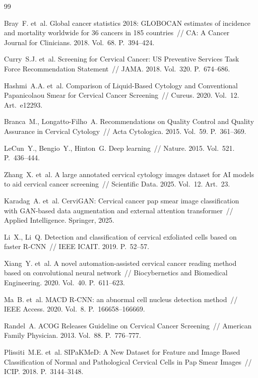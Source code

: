 \documentclass[14pt,a4paper]{extreport}
\begin{document}
\renewcommand{\bibname}{Список литературы}
\begin{thebibliography}{99}

Bray~F. et~al. Global cancer statistics 2018: GLOBOCAN estimates of
incidence and mortality worldwide for 36 cancers in 185 countries~//
CA: A Cancer Journal for Clinicians. 2018. Vol.~68. P.~394--424.

Curry~S.J. et~al. Screening for Cervical Cancer: US Preventive Services
Task Force Recommendation Statement~// JAMA. 2018. Vol.~320. P.~674--686.

Hashmi~A.A. et~al. Comparison of Liquid-Based Cytology and Conventional
Papanicolaou Smear for Cervical Cancer Screening~// Cureus. 2020.
Vol.~12. Art.~e12293.

Branca~M., Longatto-Filho~A. Recommendations on Quality Control and
Quality Assurance in Cervical Cytology~// Acta Cytologica. 2015.
Vol.~59. P.~361--369.

LeCun~Y., Bengio~Y., Hinton~G. Deep learning~// Nature. 2015. Vol.~521.
P.~436--444.

Zhang~X. et~al. A large annotated cervical cytology images dataset for
AI models to aid cervical cancer screening~// Scientific Data. 2025.
Vol.~12. Art.~23.

Karadag~A. et~al. CerviGAN: Cervical cancer pap smear image classification
with GAN-based data augmentation and external attention transformer~//
Applied Intelligence. Springer, 2025.

Li~X., Li~Q. Detection and classification of cervical exfoliated cells
based on faster R-CNN~// IEEE ICAIT. 2019. P.~52--57.

Xiang~Y. et~al. A novel automation-assisted cervical cancer reading method
based on convolutional neural network~// Biocybernetics and Biomedical
Engineering. 2020. Vol.~40. P.~611--623.

Ma~B. et~al. MACD R-CNN: an abnormal cell nucleus detection method~//
IEEE Access. 2020. Vol.~8. P.~166658--166669.

Randel~A. ACOG Releases Guideline on Cervical Cancer Screening~//
American Family Physician. 2013. Vol.~88. P.~776--777.

Plissiti~M.E. et~al. SIPaKMeD: A New Dataset for Feature and Image Based
Classification of Normal and Pathological Cervical Cells in Pap Smear
Images~// ICIP. 2018. P.~3144--3148.


\end{thebibliography}
\end{document}
